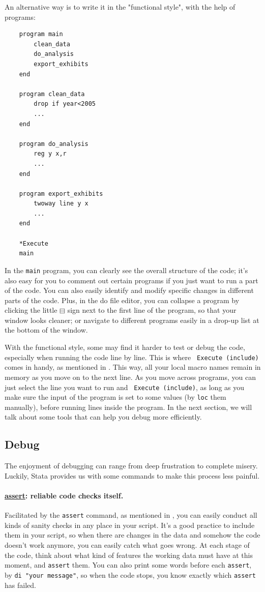 An alternative way is to write it in the "functional style", with the help of programs:
\begin{verbatim}
    program main
        clean_data
        do_analysis
        export_exhibits
    end 

    program clean_data
        drop if year<2005
        ...
    end

    program do_analysis
        reg y x,r
        ...
    end

    program export_exhibits
        twoway line y x
        ...
    end

    *Execute
    main
\end{verbatim}  
In the \verb|main| program, you can clearly see the overall structure of the code; it's also easy for you to comment out certain programs if you just want to run a part of the code. You can also easily identify and modify specific changes in different parts of the code. Plus, in the do file editor, you can collapse a program by clicking the little $\boxminus$ sign next to the first line of the program, so that your window looks cleaner; or navigate to different programs easily in a drop-up list at the bottom of the window. 

With the functional style, some may find it harder to test or debug the code, especially when running the code line by line. This is where \verb| Execute (include)| comes in handy, as mentioned in . This way, all your local macro names remain in memory as you move on to the next line. As you move across programs, you can just select the line you want to run and \verb| Execute (include)|, as long as you make sure the input of the program is set to some values (by \verb|loc| them manually), before running lines inside the program. In the next section, we will talk about some tools that can help you debug more efficiently.

\subsection{Debug}
The enjoyment of debugging can range from deep frustration to complete misery. Luckily, Stata provides us with some commands to make this process less painful. 

\paragraph{\underline{assert}: reliable code checks itself.} Facilitated by the \verb|assert| command, as mentioned in , you can easily conduct all kinds of sanity checks in any place in your script. It's a good practice to include them in your script, so when there are changes in the data and somehow the code doesn't work anymore, you can easily catch what goes wrong. At each stage of the code, think about what kind of features the working data must have at this moment, and \verb|assert| them. You can also print some words before each \verb|assert|, by \verb|di "your message"|, so when the code stops, you know exactly which \verb|assert| has failed. 

